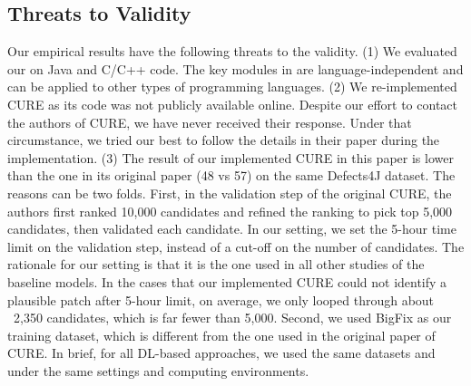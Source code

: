 \subsection{Threats to Validity}



Our empirical results have the following threats to the validity. (1)
We evaluated our {\tool} on Java and C/C++ code.  The key modules in
{\tool} are language-independent and can be applied to other types of
programming languages.  (2) We re-implemented CURE as its code was not
publicly available online. Despite our effort to contact the authors
of CURE, we have never received their response. Under that
circumstance, we tried our best to follow the details in their paper
during the implementation. (3) The result of our implemented CURE in
this paper is lower than the one in its original paper (48 vs 57) on
the same Defects4J dataset. The reasons can be two folds. First, in
the validation step of the original CURE, the authors first ranked
10,000 candidates and refined the ranking to pick top 5,000
candidates, then validated each candidate. In our setting, we set the
5-hour time limit on the validation step, instead of a cut-off on the
number of candidates. The rationale for our setting is that it is the
one used in all other studies of the baseline models. In the cases
that our implemented CURE could not identify a plausible patch after
5-hour limit, on average, we only looped through about ~2,350
candidates, which is far fewer than 5,000. Second, we used BigFix as
our training dataset, which is different from the one used in the
original paper of CURE. In brief, for all DL-based approaches, we
used the same datasets and under the same settings and
computing environments.





